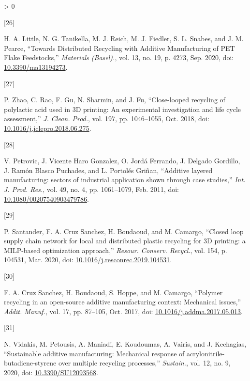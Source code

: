 \documentclass[conference,final,]{IEEEtran}
\newlength{\csllabelwidth}
\newlength{\cslhangindent}
\newenvironment{CSLReferences}[3] %
 {%
  \setlength{\parindent}{0pt}
  \ifodd #1 \everypar{\setlength{\hangindent}{\cslhangindent}}\ignorespaces\fi
  \ifnum #2 > 0
  \setlength{\parskip}{#2\baselineskip}
  \fi
 }%
 {}
\newcommand{\CSLLeftMargin}[1]{\parbox[t]{\csllabelwidth}{#1}}
\newcommand{\CSLRightInline}[1]{\parbox[t]{\linewidth - \csllabelwidth}{#1}}
\begin{document}
\begin{CSLReferences}{0}{0}
\leavevmode\hypertarget{ref-Little2020}{}%
\CSLLeftMargin{{[}26{]} }
\CSLRightInline{H. A. Little, N. G. Tanikella, M. J. Reich, M. J.
Fiedler, S. L. Snabes, and J. M. Pearce, {``{Towards Distributed
Recycling with Additive Manufacturing of PET Flake Feedstocks},''}
\emph{Materials (Basel).}, vol. 13, no. 19, p. 4273, Sep. 2020, doi:
\href{https://doi.org/10.3390/ma13194273}{10.3390/ma13194273}.}

\leavevmode\hypertarget{ref-Zhao2018}{}%
\CSLLeftMargin{{[}27{]} }
\CSLRightInline{P. Zhao, C. Rao, F. Gu, N. Sharmin, and J. Fu,
{``{Close-looped recycling of polylactic acid used in 3D printing: An
experimental investigation and life cycle assessment},''} \emph{J.
Clean. Prod.}, vol. 197, pp. 1046--1055, Oct. 2018, doi:
\href{https://doi.org/10.1016/j.jclepro.2018.06.275}{10.1016/j.jclepro.2018.06.275}.}

\leavevmode\hypertarget{ref-Petrovic2011}{}%
\CSLLeftMargin{{[}28{]} }
\CSLRightInline{V. Petrovic, J. Vicente Haro Gonzalez, O. Jordá
Ferrando, J. Delgado Gordillo, J. Ramón Blasco Puchades, and L. Portolés
Griñan, {``{Additive layered manufacturing: sectors of industrial
application shown through case studies},''} \emph{Int. J. Prod. Res.},
vol. 49, no. 4, pp. 1061--1079, Feb. 2011, doi:
\href{https://doi.org/10.1080/00207540903479786}{10.1080/00207540903479786}.}

\leavevmode\hypertarget{ref-Santander2020}{}%
\CSLLeftMargin{{[}29{]} }
\CSLRightInline{P. Santander, F. A. Cruz Sanchez, H. Boudaoud, and M.
Camargo, {``{Closed loop supply chain network for local and distributed
plastic recycling for 3D printing: a MILP-based optimization
approach},''} \emph{Resour. Conserv. Recycl.}, vol. 154, p. 104531, Mar.
2020, doi:
\href{https://doi.org/10.1016/j.resconrec.2019.104531}{10.1016/j.resconrec.2019.104531}.}

\leavevmode\hypertarget{ref-CruzSanchez2017}{}%
\CSLLeftMargin{{[}30{]} }
\CSLRightInline{F. A. Cruz Sanchez, H. Boudaoud, S. Hoppe, and M.
Camargo, {``{Polymer recycling in an open-source additive manufacturing
context: Mechanical issues},''} \emph{Addit. Manuf.}, vol. 17, pp.
87--105, Oct. 2017, doi:
\href{https://doi.org/10.1016/j.addma.2017.05.013}{10.1016/j.addma.2017.05.013}.}

\leavevmode\hypertarget{ref-Vidakis2020}{}%
\CSLLeftMargin{{[}31{]} }
\CSLRightInline{N. Vidakis, M. Petousis, A. Maniadi, E. Koudoumas, A.
Vairis, and J. Kechagias, {``{Sustainable additive manufacturing:
Mechanical response of acrylonitrile-butadiene-styrene over multiple
recycling processes},''} \emph{Sustain.}, vol. 12, no. 9, 2020, doi:
\href{https://doi.org/10.3390/SU12093568}{10.3390/SU12093568}.}


\end{CSLReferences}
\end{document}
